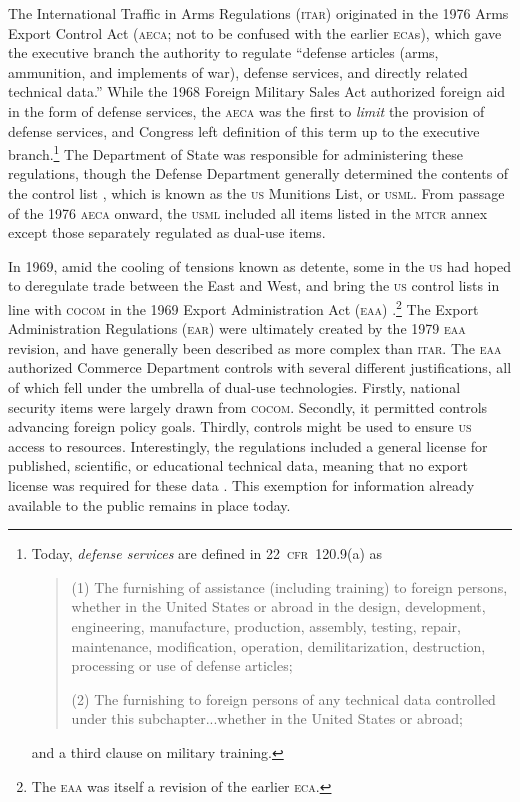 \documentclass[preprint,twocolumn,5p]{elsarticle}
\begin{document}
The International Traffic in Arms Regulations (\textsc{itar}) originated in the 1976 Arms Export Control Act (\textsc{aeca}; not to be confused with the earlier \textsc{eca}s), which gave the executive branch the authority to regulate ``defense articles (arms, ammunition, and implements of war), defense services, and directly related technical data.'' While the 1968 Foreign Military Sales Act authorized foreign aid in the form of defense services, the \textsc{aeca} was the first to \textit{limit} the provision of defense services, and Congress left definition of this term up to the executive branch.\footnote{Today, \textit{defense services} are defined in 22~\textsc{cfr}~120.9(a) as
\begin{quote}
(1) The furnishing of assistance (including training) to foreign persons, whether in the United States or abroad in the design, development, engineering, manufacture, production, assembly, testing, repair, maintenance, modification, operation, demilitarization, destruction, processing or use of defense articles;

(2) The furnishing to foreign persons of any technical data controlled under this subchapter...whether in the United States or abroad;
\end{quote}
and a third clause on military training.}
The Department of State was responsible for administering these regulations, though the Defense Department generally determined the contents of the control list \citep{NAP1987}, which is known as the \textsc{us} Munitions List, or \textsc{usml}. From passage of the 1976 \textsc{aeca} onward, the \textsc{usml} included all items listed in the \textsc{mtcr} annex except those separately regulated as dual-use items.

In 1969, amid the cooling of tensions known as detente, some in the \textsc{us} had hoped to deregulate trade between the East and West, and bring the \textsc{us} control lists in line with \textsc{cocom} in the 1969 Export Administration Act (\textsc{eaa}) \citep{NAP1987}.\footnote{The \textsc{eaa} was itself a revision of the earlier \textsc{eca}.} The Export Administration Regulations (\textsc{ear}) were ultimately created by the 1979 \textsc{eaa} revision, and have generally been described as more complex than \textsc{itar}. The \textsc{eaa} authorized Commerce Department controls with several different justifications, all of which fell under the umbrella of dual-use technologies. Firstly, national security items were largely drawn from \textsc{cocom}. Secondly, it permitted controls advancing foreign policy goals. Thirdly, controls might be used to ensure \textsc{us} access to resources. Interestingly, the regulations included a general license for published, scientific, or educational technical data, meaning that no export license was required for these data \citep{NAP1987}. This exemption for information already available to the public remains in place today.
\end{document}
